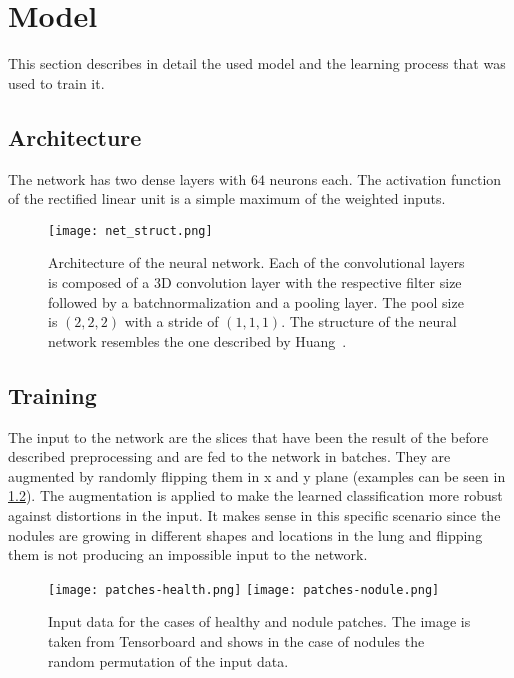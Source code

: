 \documentclass[main.tex]{subfiles}
\begin{document}
\chapter{Model}\label{chap:model}
This section describes in detail the used model and the learning process that was used to train it.



\section{Architecture}

The network has two dense layers with $64$ neurons each. The activation function of the rectified linear unit is a simple maximum of the weighted inputs.

\begin{figure}
\begin{center}
\texttt{[image: net\_struct.png]}
\end{center}
\caption{Architecture of the neural network. Each of the convolutional layers is composed of a 3D convolution layer with the respective filter size followed by a batchnormalization and a pooling layer. The pool size is $(2,2,2)$ with a stride of $(1,1,1)$. The structure of the neural network resembles the one described by Huang~\cite{huang2017lung}.}
\label{fig:net_struct}
\end{figure}


\section{Training}
The input to the network are the slices that have been the result of the before described preprocessing and are fed to the network in batches. They are augmented by randomly flipping them in x and y plane (examples can be seen in \ref{fig:input}). The augmentation is applied to make the learned classification more robust against distortions in the input. It makes sense in this specific scenario since the nodules are growing in different shapes and locations in the lung and flipping them is not producing an impossible input to the network.

\begin{figure}
\begin{center}
\texttt{[image: patches-health.png]}
\texttt{[image: patches-nodule.png]}
\end{center}
\caption{Input data for the cases of healthy and nodule patches. The image is taken from Tensorboard and shows in the case of nodules the random permutation of the input data.}
\label{fig:input}
\end{figure}
\end{document}

